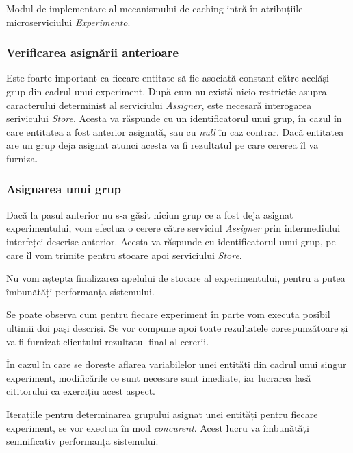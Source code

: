 \begin{remark}
	Modul de implementare al mecanismului de caching intră în atribuțiile microserviciului \textit{Experimento}.
\end{remark} 

\subsubsection{Verificarea asignării anterioare}

Este foarte important ca fiecare entitate să fie asociată constant către acelăși grup din cadrul unui experiment. După cum nu există nicio restricție asupra caracterului determinist al serviciului \textit{Assigner}, este necesară interogarea serivicului \textit{Store}. Acesta va răspunde cu un identificatorul unui grup, în cazul în care entitatea a fost anterior asignată, sau cu \textit{null} în caz contrar. 
Dacă entitatea are un grup deja asignat atunci acesta va fi rezultatul pe care cererea îl va furniza. 

\subsubsection{Asignarea unui grup}

Dacă la pasul anterior nu s-a găsit niciun grup ce a fost deja asignat experimentului, vom efectua o cerere către serviciul \textit{Assigner} prin intermediului interfeței descrise anterior. Acesta va răspunde cu identificatorul unui grup, pe care îl vom trimite pentru stocare apoi serviciului \textit{Store}. 

\begin{remark}
	Nu vom aștepta finalizarea apelului de stocare al experimentului, pentru a putea îmbunătăți performanța sistemului.
\end{remark}

Se poate observa cum pentru fiecare experiment în parte vom executa posibil ultimii doi pași descriși. Se vor compune apoi toate rezultatele corespunzătoare și va fi furnizat clientului rezultatul final al cererii.

În cazul în care se dorește aflarea variabilelor unei entități din cadrul unui singur experiment, modificările ce sunt necesare sunt imediate, iar lucrarea lasă cititorului ca exercițiu acest aspect.

\begin{remark}
	Iterațiile pentru determinarea grupului asignat unei entități pentru fiecare experiment, se vor exectua în mod \textit{concurent}. Acest lucru va îmbunătăți semnificativ performanța sistemului.
\end{remark}

